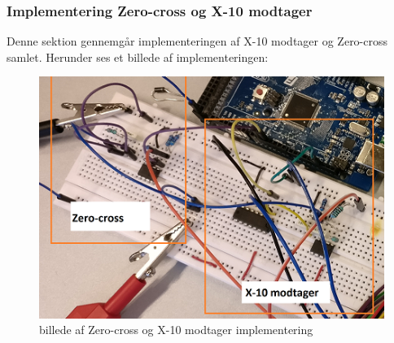 \documentclass[11pt]{article}
\begin{document}
\subsubsection{Implementering Zero-cross og X-10 modtager}
Denne sektion gennemgår implementeringen af X-10 modtager og Zero-cross samlet. Herunder ses et billede af implementeringen:
\begin{figure}[H]
	\centering
	\includegraphics[scale = 0.8]{zeroXmodtagerimp}
	\caption{billede af Zero-cross og X-10 modtager implementering}
	\label{bil:ZeroXmodimp}
\end{figure}
\end{document}
